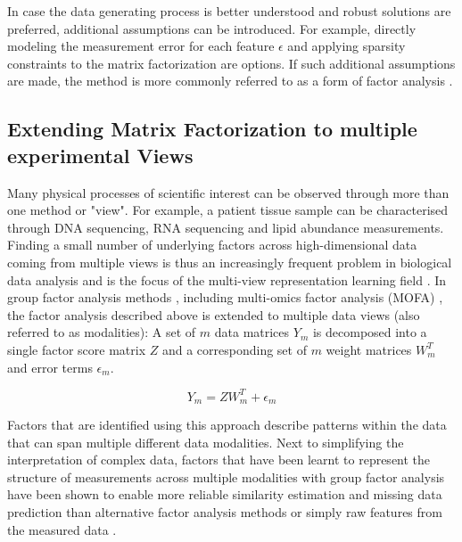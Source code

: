 \begin{flushleft}
In case the data generating process is better understood and robust solutions are preferred, additional assumptions can be introduced. For example, directly modeling the measurement error for each feature \(\epsilon\) and applying sparsity constraints to the matrix factorization are options. If such additional assumptions are made, the method is more commonly referred to as a form of factor analysis \citep{klamiGroupFactorAnalysis2014}.


\subsection{Extending Matrix Factorization to multiple experimental Views}

Many physical processes of scientific interest can be observed through more than one method or "view". For example, a patient tissue sample can be characterised through DNA sequencing, RNA sequencing and lipid abundance measurements. Finding a small number of underlying factors across high-dimensional data coming from multiple views is thus an increasingly frequent problem in biological data analysis and is the focus of the multi-view representation learning field \citep{liSurveyMultiViewRepresentation2019}. In group factor analysis methods \citep{virtanenBayesianGroupFactor2012, klamiGroupFactorAnalysis2014}, including multi-omics factor analysis (MOFA) \citep{argelaguetMultiOmicsFactorAnalysis2018b, argelaguetMOFAStatisticalFramework2020a}, the factor analysis described above is extended to multiple data views (also referred to as modalities): A set of \(m\) data matrices \( Y_m \) is decomposed into a single factor score matrix \( Z \) and a corresponding set of \(m\) weight matrices \( W_m^T \) and error terms \(\epsilon_m\). 

\begin{equation}
    Y_m = ZW_m^T + \epsilon_m
\end{equation}

Factors that are identified using this approach describe patterns within the data that can span multiple different data modalities. Next to simplifying the interpretation of complex data, factors that have been learnt to represent the structure of measurements across multiple modalities with group factor analysis have been shown to enable more reliable similarity estimation and missing data prediction than alternative factor analysis methods or simply raw features from the measured data \citep{klamiGroupFactorAnalysis2014}.


\end{flushleft}
